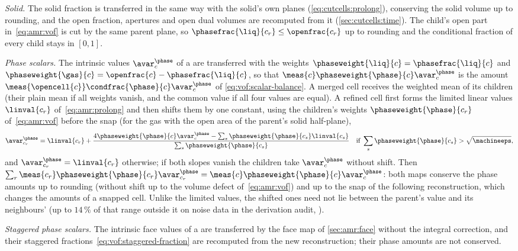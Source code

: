 \emph{Solid.} The solid fraction is transferred in the same way with the
solid's own planes (\cref{eq:cutcells:prolong}), conserving the solid volume
up to rounding, and the open fraction, apertures and open dual volumes are
recomputed from it (\cref{sec:cutcells:time}). The child's open part
in~\cref{eq:amr:vof} is cut by the same parent plane, so
$\phasefrac{\liq}{c_r}\le\openfrac{c_r}$ up to rounding and the conditional
fraction of every child stays in $[0,1]$.

\emph{Phase scalars.} The intrinsic values $\avar^{\phase}_c$ of a
 are transferred with the weights
$\phaseweight{\liq}{c}=\phasefrac{\liq}{c}$ and
$\phaseweight{\gas}{c}=\openfrac{c}-\phasefrac{\liq}{c}$, so that
$\meas{c}\phaseweight{\phase}{c}\avar^{\phase}_c$ is the amount
$\meas{\opencell{c}}\condfrac{\phase}{c}\avar^{\phase}_c$ of
\cref{eq:vof:scalar-balance}. A merged cell receives the weighted mean of its
children (their plain mean if all weights vanish, and the common value if all
four values are equal). A refined cell first forms the limited linear
values $\linval{c_r}$ of~\cref{eq:amr:prolong} and then shifts them by one
constant, using the children's weights $\phaseweight{\phase}{c_r}$
of~\cref{eq:amr:vof} before the snap (for the gas with the open area of the
parent's solid half-plane),
\begin{equation}\label{eq:amr:scalar}
  \avar^{\phase}_{c_r}=\linval{c_r}+\frac{4\phaseweight{\phase}{c}\avar^{\phase}_c-\sum_{s}\phaseweight{\phase}{c_s}\linval{c_s}}
    {\sum_{s}\phaseweight{\phase}{c_s}}
  \quad\text{if }\sum_{s}\phaseweight{\phase}{c_s}>\sqrt{\machineeps},
\end{equation}
and $\avar^{\phase}_{c_r}=\linval{c_r}$ otherwise; if both slopes vanish the
children take $\avar^{\phase}_c$ without shift. Then
$\sum_r\meas{c_r}\phaseweight{\phase}{c_r}\avar^{\phase}_{c_r}=\meas{c}\phaseweight{\phase}{c}\avar^{\phase}_c$:
both maps conserve the phase amounts up to rounding (without shift up to the
volume defect of~\cref{eq:amr:vof}) and up to the snap of the following
reconstruction, which changes the amounts of a snapped cell. Unlike the
limited values, the shifted ones need not lie between the parent's value and
its neighbours' (up to $14\,\%$ of that range outside it on noise data in the
derivation audit, ).

\emph{Staggered phase scalars.} The intrinsic face values of a
 are transferred by the face map of
\cref{sec:amr:face} without the integral correction, and their staggered
fractions~\cref{eq:vof:staggered-fraction} are recomputed from the new
reconstruction; their phase amounts are not conserved.

